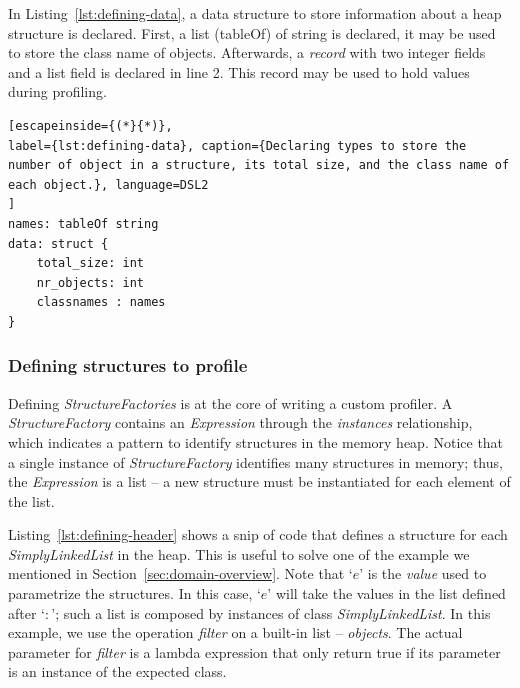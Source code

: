 In Listing~\ref{lst:defining-data}, a data structure to store information about a heap structure is declared.
First, a list (tableOf) of string is declared, it may be used to store the class name of objects.
Afterwards, a \textit{record} with two integer fields and a list field is declared in line 2.
This record may be used to hold values during profiling.

\begin{lstlisting}[escapeinside={(*}{*)}, 
label={lst:defining-data}, caption={Declaring types to store the number of object in a structure, its total size, and the class name of each object.}, language=DSL2
]
names: tableOf string
data: struct {
	total_size: int
	nr_objects: int
	classnames : names
}
\end{lstlisting}

\subsubsection*{Defining structures to profile}
Defining \textit{StructureFactories} is at the core of writing a custom profiler.
A \textit{StructureFactory} contains an \textit{Expression} through the \textit{instances} relationship, which indicates a pattern to identify structures in the memory heap.
Notice that a single instance of \textit{StructureFactory} identifies many structures in memory; thus, the \textit{Expression} is a list -- a new structure must be instantiated for each element of the list.


Listing~\ref{lst:defining-header} shows a snip of code that defines a structure for each \textit{SimplyLinkedList} in the heap.
This is useful to solve one of the example we mentioned in Section~\ref{sec:domain-overview}.
Note that `$e$' is the \textit{value} used to parametrize the structures.
In this case, `$e$' will take the values in the list defined after `$:$'; such a list is composed by instances of class \textit{SimplyLinkedList}.
In this example, we use the operation \textit{filter} on a built-in list -- \textit{objects}.
The actual parameter for \textit{filter} is a lambda expression that only return true if its parameter is an instance of the expected class. 

